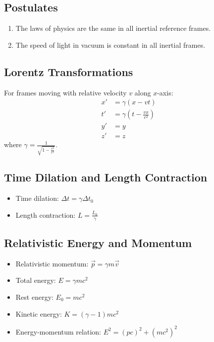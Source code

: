 \documentclass[11pt]{article}
\theoremstyle{definition}
\begin{document}
\subsection{Postulates}
\begin{enumerate}
    \item The laws of physics are the same in all inertial reference frames.
    \item The speed of light in vacuum is constant in all inertial frames.
\end{enumerate}

\subsection{Lorentz Transformations}
For frames moving with relative velocity $v$ along $x$-axis:
\begin{align}
    x' &= \gamma(x - vt) \\
    t' &= \gamma\left(t - \frac{vx}{c^2}\right) \\
    y' &= y \\
    z' &= z
\end{align}
where $\gamma = \frac{1}{\sqrt{1-\frac{v^2}{c^2}}}$.

\subsection{Time Dilation and Length Contraction}
\begin{itemize}
    \item Time dilation: $\Delta t = \gamma \Delta t_0$
    \item Length contraction: $L = \frac{L_0}{\gamma}$
\end{itemize}

\subsection{Relativistic Energy and Momentum}
\begin{itemize}
    \item Relativistic momentum: $\vec{p} = \gamma m \vec{v}$
    \item Total energy: $E = \gamma mc^2$
    \item Rest energy: $E_0 = mc^2$
    \item Kinetic energy: $K = (\gamma - 1)mc^2$
    \item Energy-momentum relation: $E^2 = (pc)^2 + (mc^2)^2$
\end{itemize}
\end{document}
